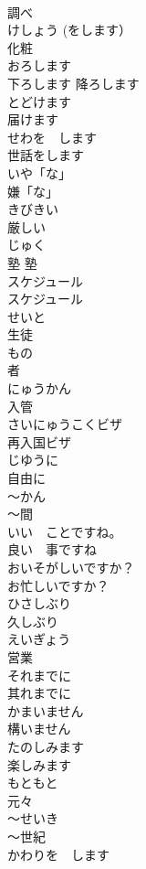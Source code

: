 \documentclass[8pt]{extreport}
\begin{document}
\begin{CJK}{UTF8}{min}
\\	調べ		
\\	けしょう (をします）	
\\	化粧		
\\	おろします	
\\	下ろします 降ろします	
\\	とどけます	
\\	届けます	
\\	せわを　します	
\\	世話をします	
\\	いや「な」	
\\	嫌「な」	
\\	きびきい	
\\	厳しい	
\\	じゅく	
\\	塾 塾		
\\	スケジュール	
\\	スケジュール	
\\	せいと	
\\	生徒		
\\	もの	
\\	者		
\\	にゅうかん	
\\	入管	
\\	さいにゅうこくビザ	
\\	再入国ビザ		
\\	じゆうに	
\\	自由に	
\\	〜かん	
\\	〜間		
\\	いい　ことですね。	
\\	良い　事ですね		
\\	おいそがしいですか？	
\\	お忙しいですか？		
\\	ひさしぶり	
\\	久しぶり	
\\	えいぎょう	
\\	営業		
\\	それまでに	
\\	其れまでに		
\\	かまいません	
\\	構いません	
\\	たのしみます	
\\	楽しみます		
\\	もともと	
\\	元々		
\\	〜せいき	
\\	〜世紀		
\\	かわりを　します	

\end{CJK}
\end{document}
